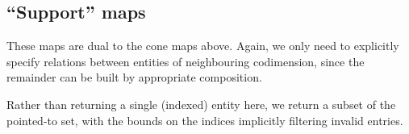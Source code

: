 \documentclass[a4paper,11pt]{article}
\begin{document}
\subsection{``Support'' maps}
\label{sec:support-maps}
These maps are dual to the cone maps above. Again, we only need to
explicitly specify relations between entities of neighbouring
codimension, since the remainder can be built by appropriate
composition.

Rather than returning a single (indexed) entity here, we return a
subset of the pointed-to set, with the bounds on the indices
implicitly filtering invalid entries.
\end{document}
